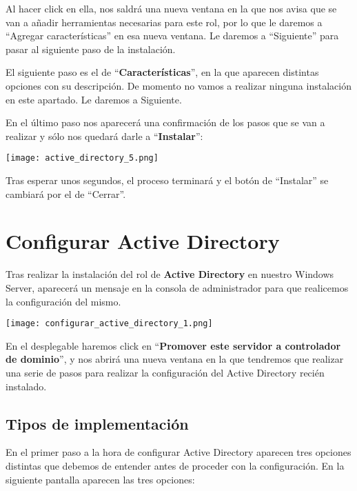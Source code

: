 Al hacer click en ella, nos saldrá una nueva ventana en la que nos avisa que se van a añadir herramientas necesarias para este rol, por lo que le daremos a “Agregar características” en esa nueva ventana. Le daremos a “Siguiente” para pasar al siguiente paso de la instalación.

El siguiente paso es el de “\textbf{Características}”, en la que aparecen distintas opciones con su descripción. De momento no vamos a realizar ninguna instalación en este apartado. Le daremos a Siguiente.

En el último paso nos aparecerá una confirmación de los pasos que se van a realizar y sólo nos quedará darle a “\textbf{Instalar}”:

\begin{center}
    \vspace{-15pt}
    \texttt{[image: active\_directory\_5.png]}
    \vspace{-15pt}
\end{center}

Tras esperar unos segundos, el proceso terminará y el botón de “Instalar” se cambiará por el de “Cerrar”.

\section{Configurar Active Directory}
Tras realizar la instalación del rol de \textbf{Active Directory} en nuestro Windows Server, aparecerá un mensaje en la consola de administrador para que realicemos la configuración del mismo.

\begin{center}
    \texttt{[image: configurar\_active\_directory\_1.png]}
\end{center}

En el desplegable haremos click en “\textbf{Promover este servidor a controlador de dominio}”, y nos abrirá una nueva ventana en la que tendremos que realizar una serie de pasos para realizar la configuración del Active Directory recién instalado.


\subsection{Tipos de implementación}
En el primer paso a la hora de configurar Active Directory aparecen tres opciones distintas que debemos de entender antes de proceder con la configuración. En la siguiente pantalla aparecen las tres opciones:

